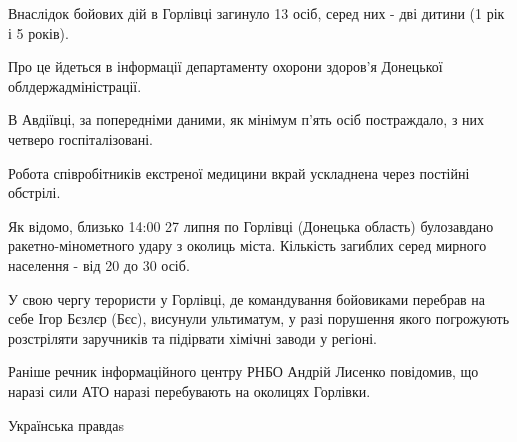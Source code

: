 \documentclass[a4paper]{article}
\begin{document}
Внаслідок бойових дій в Горлівці загинуло 13 осіб, серед них - дві дитини (1 рік і 5 років).

Про це йдеться в інформації департаменту охорони здоров'я Донецької облдержадміністрації.
 
В Авдіївці, за попередніми даними, як мінімум п'ять осіб постраждало, з них четверо госпіталізовані.

Робота співробітників екстреної медицини вкрай ускладнена через постійні обстрілі.

Як відомо, близько 14:00 27 липня по Горлівці (Донецька область) булозавдано ракетно-мінометного удару з околиць міста. Кількість загиблих серед мирного населення - від 20 до 30 осіб. 

У свою чергу терористи у Горлівці, де командування бойовиками перебрав на себе Ігор Бєзлєр (Бєс), висунули ультиматум, у разі порушення якого погрожують розстріляти заручників та підірвати хімічні заводи у регіоні. 

Раніше речник інформаційного центру РНБО Андрій Лисенко повідомив, що наразі сили АТО наразі перебувають на околицях Горлівки.

Українська правдаs
\end{document}
